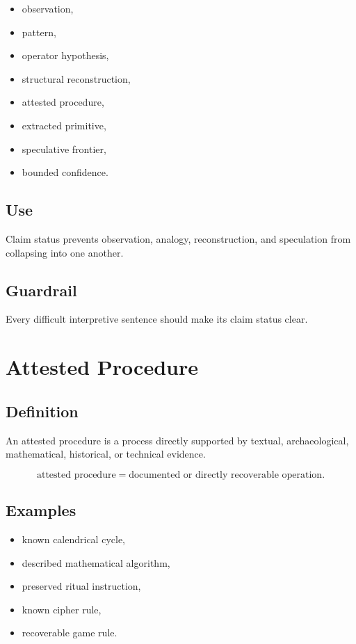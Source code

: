 \documentclass[11pt]{book}
\begin{document}
\begin{itemize}
    \item observation,
    \item pattern,
    \item operator hypothesis,
    \item structural reconstruction,
    \item attested procedure,
    \item extracted primitive,
    \item speculative frontier,
    \item bounded confidence.
\end{itemize}

\subsection*{Use}

Claim status prevents observation, analogy, reconstruction, and speculation from collapsing into one another.

\subsection*{Guardrail}

Every difficult interpretive sentence should make its claim status clear.

\section{Attested Procedure}

\subsection*{Definition}

An attested procedure is a process directly supported by textual, archaeological, mathematical, historical, or technical evidence.

\[
\text{attested procedure} = \text{documented or directly recoverable operation}.
\]

\subsection*{Examples}

\begin{itemize}
    \item known calendrical cycle,
    \item described mathematical algorithm,
    \item preserved ritual instruction,
    \item known cipher rule,
    \item recoverable game rule.
\end{itemize}
\end{document}

